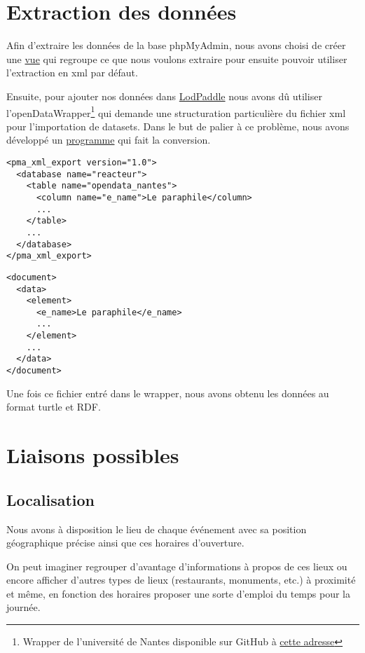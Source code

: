 \documentclass[12pt,a4paper]{article}
\begin{document}
	\section{Extraction des données}	
	Afin d'extraire les données de la base phpMyAdmin, nous avons choisi de créer une \href{http://github.com/masterALMA2016/DataLeReacteur/blob/master/extract/views.sql}{vue} qui regroupe ce que nous voulons extraire pour ensuite pouvoir utiliser l'extraction en xml par défaut. 
	
	
	Ensuite, pour ajouter nos données dans \href{http://lodpaddle.univ-nantes.fr/lodpaddle}{LodPaddle} nous avons dû utiliser l'openDataWrapper\footnote{Wrapper de l'université de Nantes disponible sur GitHub à \href{http://github.com/masterALMA2016/openDataWrapper}{cette adresse}} qui demande une structuration particulière du fichier xml pour l'importation de datasets. Dans le but de palier à ce problème, nous avons développé un \href{http://github.com/masterALMA2016/DataLeReacteur/blob/master/extract/Pma2xml.java}{programme} qui fait la conversion. 
	
	\begin{lstlisting}[frame=single,caption=Export phpMyAdmin]
<pma_xml_export version="1.0">
  <database name="reacteur">
    <table name="opendata_nantes">
      <column name="e_name">Le paraphile</column>
	  ...
	</table>
    ...
  </database>
</pma_xml_export>
	\end{lstlisting}
	
	\begin{lstlisting}[frame=single,caption=Format du  wrapper]
<document>
  <data>
    <element>
	  <e_name>Le paraphile</e_name>
	  ...
	</element>
	...
  </data>
</document>
	\end{lstlisting}
	
Une fois ce fichier entré dans le wrapper, nous avons obtenu les données au format turtle et RDF.
	
	\section{Liaisons possibles}
	\subsection{Localisation}
	Nous avons à disposition le lieu de chaque événement avec sa position géographique précise ainsi que ces horaires d'ouverture. 
	
On peut imaginer regrouper d'avantage d'informations à propos de ces lieux ou encore afficher d'autres types de lieux (restaurants, monuments, etc.) à proximité et même, en fonction des horaires proposer une sorte d'emploi du temps pour la journée.
\end{document}
